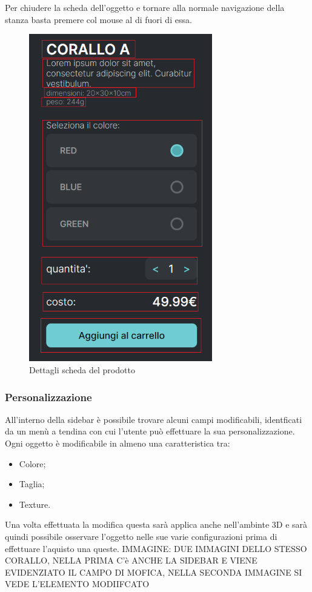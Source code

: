 Per chiudere la scheda dell'oggetto e tornare alla normale navigazione della stanza basta premere col mouse al di fuori di essa.
\begin{figure}[H]
  \renewcommand{\thefigure}{1}
\begin{center}
  \includegraphics[width=8cm]{./res/images/scheda_evidenziata.png}
 \end{center}
 \caption{Dettagli scheda del prodotto}
  \label{Dettagli scheda del prodotto}
\end{figure}
\subsubsection{Personalizzazione}
All'interno della sidebar è possibile trovare alcuni campi modificabili, identficati da un menù a tendina con cui l'utente può effettuare la sua personalizzazione.
Ogni oggetto è modificabile in almeno una caratteristica tra:
\begin{itemize}
	\item Colore;
	\item Taglia;
	\item Texture.
\end{itemize}
Una volta effettuata la modifica questa sarà applica anche nell'ambinte 3D e sarà quindi possibile osservare l'oggetto nelle sue varie configurazioni prima di effettuare l'aquisto una queste.
IMMAGINE: DUE IMMAGINI DELLO STESSO CORALLO, NELLA PRIMA C'è ANCHE LA SIDEBAR E VIENE EVIDENZIATO IL CAMPO DI MOFICA, NELLA SECONDA IMMAGINE SI VEDE L'ELEMENTO MODIIFCATO
